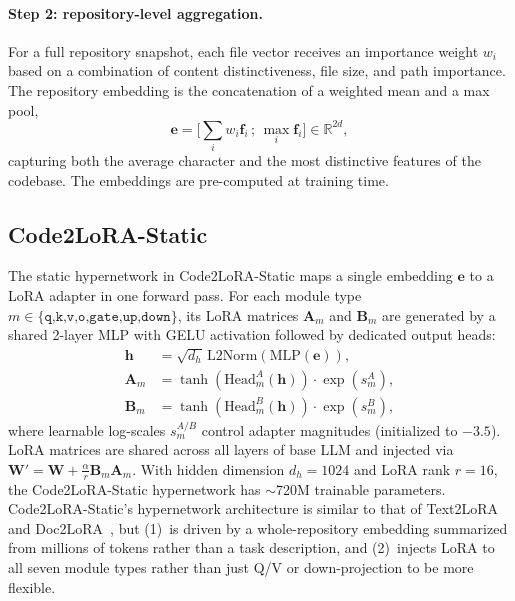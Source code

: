 \documentclass[11pt]{article}
\newcommand{\codelora}{Code2LoRA\xspace}
\newcommand{\codelorastatic}{\codelora-Static\xspace}
\newcommand{\textlora}{Text2LoRA\xspace}
\newcommand{\doclora}{Doc2LoRA\xspace}
\begin{document}
\paragraph{Step 2: repository-level aggregation.}
For a full repository snapshot, each file vector receives an importance weight $w_i$ based on a combination of content distinctiveness, file size, and path importance.
The repository embedding is the concatenation of a weighted mean and a max pool,
\begin{equation*}
\mathbf{e} = \big[\textstyle\sum_i w_i \mathbf{f}_i \,;\, \max_i \mathbf{f}_i\big] \in \mathbb{R}^{2d},
\end{equation*}
capturing both the average character and the most distinctive features of the codebase.
The embeddings are pre-computed at training time.

\subsection{\codelorastatic{}}
\label{sec:method:static}

The static hypernetwork in \codelorastatic{} maps a single embedding $\mathbf{e}$ to a LoRA adapter in one forward pass.
For each module type $m \in \{\texttt{q,k,v,o,gate,up,down}\}$, its LoRA matrices $\mathbf{A}_m$ and $\mathbf{B}_m$ are generated by a shared 2-layer MLP with GELU activation followed by dedicated output heads:
\begin{align*}
\mathbf{h} &= \sqrt{d_h}\,\mathrm{L2Norm}(\mathrm{MLP}(\mathbf{e})), \\
\mathbf{A}_m &= \tanh(\mathrm{Head}^A_m(\mathbf{h})) \cdot \exp(s^A_m),\\
\mathbf{B}_m &= \tanh(\mathrm{Head}^B_m(\mathbf{h})) \cdot \exp(s^B_m),
\end{align*}
where
learnable log-scales $s^{A/B}_m$ control adapter magnitudes (initialized to $-3.5$).
LoRA matrices are shared across all layers of base LLM and injected via $\mathbf{W}' = \mathbf{W} + \tfrac{\alpha}{r}\mathbf{B}_m\mathbf{A}_m$.
With hidden dimension $d_h{=}1024$ and LoRA rank $r{=}16$, the \codelorastatic{} hypernetwork has ${\sim}$720M trainable parameters.
\codelorastatic{}'s hypernetwork architecture is similar to that of \textlora{}~\cite{charakorn2025text2lora} and \doclora{}~\cite{charakorn2026doctolora}, but (1)~is driven by a whole-repository embedding summarized from millions of tokens rather than a task description, and (2)~injects LoRA to all seven module types rather than just Q/V or down-projection to be more flexible.
\end{document}
